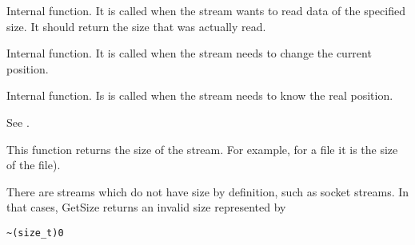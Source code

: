 Internal function. It is called when the stream wants to read data of the
specified size. It should return the size that was actually read.



Internal function. It is called when the stream needs to change the
current position.



Internal function. Is is called when the stream needs to know the
real position.



See .

\label{wxstreambasegetsize}


This function returns the size of the stream. For example, for a file it is the size of
the file).


There are streams which do not have size by definition, such as socket streams.
In that cases, GetSize returns an invalid size represented by

\begin{verbatim}
~(size_t)0
\end{verbatim}

